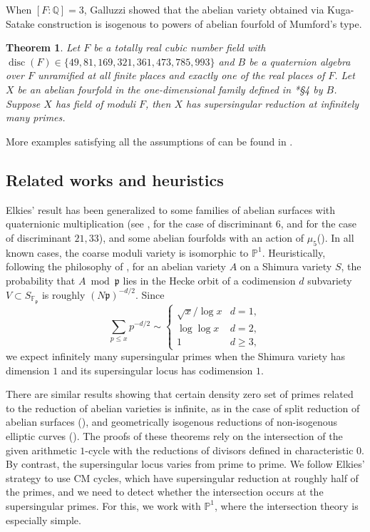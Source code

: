 \documentclass{amsart}
\numberwithin{equation}{subsection}
\newtheorem{theorem}{Theorem}
\numberwithin{theorem}{section}
\theoremstyle{definition}
\theoremstyle{remark}
\newcommand{\bF}{\mathbb{F}}
\newcommand{\bP}{\mathbb{P}}
\newcommand{\bQ}{\mathbb{Q}}
\newcommand{\fp}{\mathfrak{p}}
\DeclareMathOperator{\disc}{disc}
\begin{document}
When $[F:\bQ] = 3$, Galluzzi \cite{MR1909819} showed that the abelian variety obtained via Kuga-Satake construction is isogenous to powers of abelian fourfold of Mumford's type. 

\begin{theorem}\label{thm:Mumfordfourfold}
    Let $F$ be a totally real cubic number field with $\disc(F) \in \{49, 81, 169, 321, 361, \allowbreak 473, 785, 993\}$ and $B$ be a quaternion algebra over $F$ unramified at all finite places and exactly one of the real places of $F$. Let $X$ be an abelian fourfold in the one-dimensional family defined in \cite{MR248146}*{\S4} by $B$. Suppose $X$ has field of moduli $F$, then $X$ has supersingular reduction at infinitely many primes. 
\end{theorem}

More examples satisfying all the assumptions of  can be found in . 

\subsection{Related works and heuristics}
Elkies' result has been generalized to some families of abelian surfaces with quaternionic multiplication (see  \cite{MR2414789},\cite{MR2704678} for the case of discriminant $6$, and \cite{MR2705896} for the case of discriminant $21, 33$), and some abelian fourfolds with an action of $\mu_5$(\cite{LMPT}). In all known cases, the coarse moduli variety is isomorphic to $\bP^1$. Heuristically, following the philosophy of \cite{MR3841493}, for an abelian variety $A$ on a Shimura variety $S$, 
the probability that $A \bmod\fp$ lies in the Hecke orbit of a codimension $d$ subvariety $V \subset S_{\bF_{\fp}}$ is roughly $(N\fp)^{-d/2}$. Since \[\sum_{p \leq x} p^{-d/2} \sim \begin{cases}
    \sqrt{x}/\log x & d = 1, \\ \log\log x & d = 2, \\ 1 & d\geq 3,
\end{cases}\] we expect infinitely many supersingular primes when the Shimura variety has dimension $1$ and its supersingular locus has codimension $1$.
 

There are similar results showing that certain density zero set of primes related to the reduction of abelian varieties is infinite, as in the case of split reduction of abelian surfaces (\cites{MR4065146,MR4490194, MR4836458}), and geometrically isogenous reductions of non-isogenous elliptic curves (\cite{MR3843371}). The proofs of these theorems rely on the intersection of the given arithmetic $1$-cycle with the reductions of divisors defined in characteristic $0$. By contrast, the supersingular locus varies from prime to prime. We follow Elkies' strategy to use CM cycles, which have supersingular reduction at roughly half of the primes, and we need to detect whether the intersection occurs at the supersingular primes. For this, we work with $\bP^1$, where the intersection theory is especially simple. 
\end{document}
